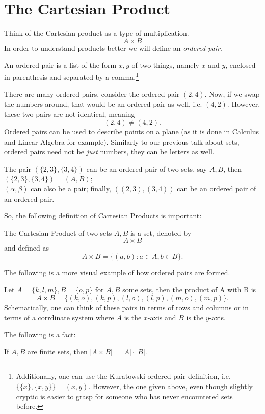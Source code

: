 \section{The Cartesian Product}
Think of the Cartesian product as a type of multiplication. 
$$
A \times B 
$$
In order to understand products better we will define an \emph{ordered pair}.
\begin{defn}
An ordered pair is a list of the form $x,y$ of two things, namely $x$ and $y$, enclosed in parenthesis and separated by a comma.\footnote{Additionally, one can use the Kuratowski ordered pair definition, i.e. $\{\{x\}, \{x,y\}\}=(x,y)$. However, the one given above, even though slightly cryptic is easier to grasp for someone who has never encountered sets before.}
\end{defn}

There are many ordered pairs, consider the ordered pair $(2,4)$. Now, if we swap the numbers around, that would be an ordered pair as well, i.e. $(4,2)$. However, these two pairs are not identical, meaning 
$$
(2,4) \ne (4,2).
$$
Ordered pairs can be used to describe points on a plane (as it is done in Calculus and Linear Algebra for example). Similarly to our previous talk about sets, ordered pairs need not be \emph{just} numbers, they can be letters as well. 
\begin{example}
    The pair $(\{2,3\}, \{3,4\})$ can be an ordered pair of two sets, say $A,B$, then $(\{2,3\},\{3,4\})=(A,B)$;\\
    $(\alpha,\beta)$ can also be a pair;
    finally, $((2,3),(3,4))$ can be an ordered pair of an ordered pair. 
\end{example}
So, the following definition of Cartesian Products is important: 
\begin{defn}
    The Cartesian Product of two sets $A,B$ is a set, denoted by 
    $$
    A\times B
    $$
    and defined as 
    $$
    A\times B = \{(a,b): a\in A, b\in B\}.
    $$
\end{defn}

The following is a more visual example of how ordered pairs are formed.
\begin{example}
    Let $A=\{k,l,m\}, B=\{o,p\}$ for $A,B$ some sets, then the product of A with B is 
    $$
    A\times B = \{(k,o),(k,p),(l,o),(l,p),(m,o),(m,p)\}.
    $$
    Schematically, one can think of these pairs in terms of rows and columns or in terms of a corrdinate system where $A$ is the $x$-axis and $B$ is the $y$-axis. 
\end{example}
The following is a fact: 
\begin{fact}
    If $A,B$ are finite sets, then $\lvert A\times B \rvert = \lvert A \rvert\cdot \lvert B \rvert$.
\end{fact}

